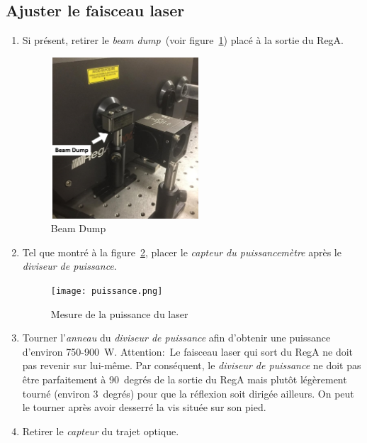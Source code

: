 \subsection{Ajuster le faisceau laser}
\begin{enumerate}
   \item Si présent, retirer le \textit{beam dump}~(voir figure~\ref{fig:beam-dump}) placé à la sortie du RegA.
        \begin{figure}[H]
        \centering
        \includegraphics[height=6cm]{beam-dump.png}
        \caption{Beam Dump}
        \label{fig:beam-dump}
        \end{figure}
    \item Tel que montré à la figure~\ref{fig:puissance}, placer le \textit{capteur du puissancemètre} après le \textit{diviseur de puissance}.
        \begin{figure}[H]
        \centering
        \texttt{[image: puissance.png]}
        \caption{Mesure de la puissance du laser}
        \label{fig:puissance}
        \end{figure}
    \item Tourner l'\textit{anneau} du \textit{diviseur de puissance} afin d'obtenir une puissance d'environ 750-900~W. Attention:~Le faisceau laser qui sort du RegA ne doit pas revenir sur lui-même. Par conséquent, le \textit{diviseur de puissance} ne doit pas être parfaitement à 90~degrés de la sortie du RegA mais plutôt légèrement tourné (environ 3~degrés) pour que la réflexion soit dirigée ailleurs. On peut le tourner après avoir desserré la vis située sur son pied.
    \item Retirer le \textit{capteur} du trajet optique.
        \begin{figure}[H]
        \centering

\end{figure}
\end{enumerate}
